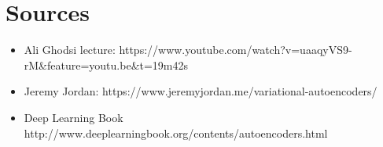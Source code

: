 \documentclass{article}
\begin{document}
\section{Sources}
\begin{itemize}
    \item Ali Ghodsi lecture: https://www.youtube.com/watch?v=uaaqyVS9-rM&feature=youtu.be&t=19m42s
    \item Jeremy Jordan: https://www.jeremyjordan.me/variational-autoencoders/
    \item Deep Learning Book http://www.deeplearningbook.org/contents/autoencoders.html
\end{itemize}{}
\end{document}
